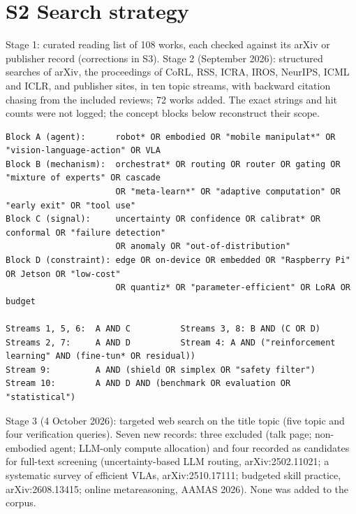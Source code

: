 \documentclass[10pt,a4paper]{article}
\begin{document}
\section*{S2 Search strategy}
Stage 1: curated reading list of 108 works, each checked against its arXiv or publisher record (corrections in S3). Stage 2 (September 2026): structured searches of arXiv, the proceedings of CoRL, RSS, ICRA, IROS, NeurIPS, ICML and ICLR, and publisher sites, in ten topic streams, with backward citation chasing from the included reviews; 72 works added. The exact strings and hit counts were not logged; the concept blocks below reconstruct their scope.
{\scriptsize\begin{verbatim}
Block A (agent):      robot* OR embodied OR "mobile manipulat*" OR "vision-language-action" OR VLA
Block B (mechanism):  orchestrat* OR routing OR router OR gating OR "mixture of experts" OR cascade
                      OR "meta-learn*" OR "adaptive computation" OR "early exit" OR "tool use"
Block C (signal):     uncertainty OR confidence OR calibrat* OR conformal OR "failure detection"
                      OR anomaly OR "out-of-distribution"
Block D (constraint): edge OR on-device OR embedded OR "Raspberry Pi" OR Jetson OR "low-cost"
                      OR quantiz* OR "parameter-efficient" OR LoRA OR budget

Streams 1, 5, 6:  A AND C          Streams 3, 8: B AND (C OR D)
Streams 2, 7:     A AND D          Stream 4: A AND ("reinforcement learning" AND (fine-tun* OR residual))
Stream 9:         A AND (shield OR simplex OR "safety filter")
Stream 10:        A AND D AND (benchmark OR evaluation OR "statistical")
\end{verbatim}}
Stage 3 (4 October 2026): targeted web search on the title topic (five topic and four verification queries). Seven new records: three excluded (talk page; non-embodied agent; LLM-only compute allocation) and four recorded as candidates for full-text screening (uncertainty-based LLM routing, arXiv:2502.11021; a systematic survey of efficient VLAs, arXiv:2510.17111; budgeted skill practice, arXiv:2608.13415; online metareasoning, AAMAS 2026). None was added to the corpus.
\end{document}
